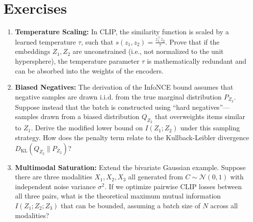 \section{Exercises}
\begin{enumerate}
    \item \textbf{Temperature Scaling:} In CLIP, the similarity function is scaled by a learned temperature $\tau$, such that $s(z_1, z_2) = \frac{z_1^\top z_2}{\tau}$. Prove that if the embeddings $Z_1, Z_2$ are unconstrained (i.e., not normalized to the unit hypersphere), the temperature parameter $\tau$ is mathematically redundant and can be absorbed into the weights of the encoders. 
    \item \textbf{Biased Negatives:} The derivation of the InfoNCE bound assumes that negative samples are drawn i.i.d. from the true marginal distribution $P_{Z_2}$. Suppose instead that the batch is constructed using ``hard negatives''—samples drawn from a biased distribution $Q_{Z_2}$ that overweights items similar to $Z_1$. Derive the modified lower bound on $I(Z_1; Z_2)$ under this sampling strategy. How does the penalty term relate to the Kullback-Leibler divergence $D_{\text{KL}}(Q_{Z_2} \parallel P_{Z_2})$?
    \item \textbf{Multimodal Saturation:} Extend the bivariate Gaussian example. Suppose there are three modalities $X_1, X_2, X_3$ all generated from $C \sim \mathcal{N}(0,1)$ with independent noise variance $\sigma^2$. If we optimize pairwise CLIP losses between all three pairs, what is the theoretical maximum mutual information $I(Z_1; Z_2; Z_3)$ that can be bounded, assuming a batch size of $N$ across all modalities?
\end{enumerate}

